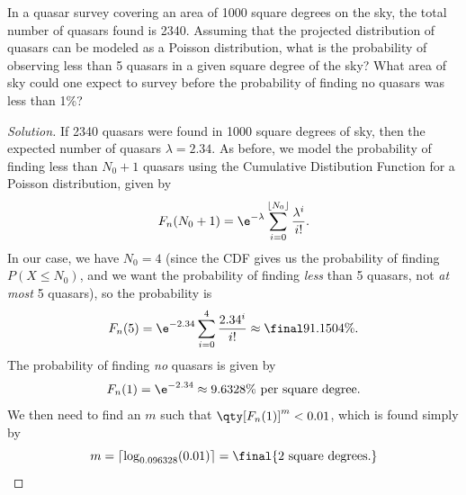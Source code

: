 \documentclass[10pt, physics]{homework}
\newcommand\floor[1]{\left\lfloor #1 \right\rfloor}
\newcommand\ceiling[1]{\left\lceil #1 \right\rceil}
\begin{document}
	\begin{problem}[4pts]
		In a quasar survey covering an area of 1000 square degrees on the sky, the total number of quasars found is 2340. Assuming that the projected distribution of quasars can be modeled as a Poisson distribution, what is the probability of observing less than 5 quasars in a given square degree of the sky? What area of sky could one expect to survey before the probability of finding no quasars was less than 1\%?
	\end{problem}
	\begin{proof}[Solution]
		If 2340 quasars were found in 1000 square degrees of sky, then the expected number of quasars $\lambda = 2.34$.
		As before, we model the probability of finding less than $N_0 + 1$ quasars using the Cumulative Distibution Function for a Poisson distribution, given by
		\[ F_n(N_0 + 1) = \e^{-\lambda} \sum_{i = 0}^{\floor{N_0}} \frac{\lambda^i}{i!}. \]
		In our case, we have $N_0 = 4$ (since the CDF gives us the probability of finding $P(X \leq N_0)$, and we want the probability of finding \emph{less} than 5 quasars, not \emph{at most} 5 quasars), so the probability is
		\[ F_n(5) = \e^{-2.34} \sum_{i=0}^4 \frac{2.34^i}{i!} \approx \final{91.1504\%.} \]
		The probability of finding \emph{no} quasars is given by 
		\[ F_n(1) = \e^{-2.34} \approx 9.6328\% \text{ per square degree.} \]
		We then need to find an $m$ such that $\qty[F_n(1)]^m < 0.01$, which is found simply by
		\[ m = \ceiling{\log_{0.096328}(0.01)} = \final{2 \text{ square degrees.}} \qedhere \]
	\end{proof}
\end{document}
